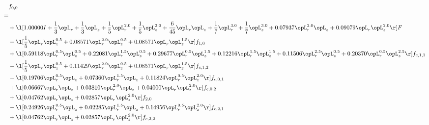 \begin{alignat}{2} 
\label{eq:f_00_2} 
& f_{0,0} \nonumber \\ 
 = \\ 
& + \l[  1.00000 I + \frac{1}{3} \opL_r + \frac{1}{3} \opL_z + \frac{1}{5} \opL_r^{2.0} + \frac{1}{5} \opL_z^{2.0} + \frac{6}{45} \opL_r \opL_z + \frac{1}{7} \opL_r^{3.0} + \frac{1}{7} \opL_z^{3.0} +  0.07937 \opL_r^{2.0} \opL_z +  0.09079 \opL_r \opL_z^{2.0}  \r] F \nonumber \\ 
& - \l[ \frac{1}{5} \opL_r \opL_z^{0.5} +  0.08571 \opL_r^{2.0} \opL_z^{0.5} +  0.08571 \opL_r \opL_z^{1.5}  \r] f_{1,0} \nonumber \\ 
& + \l[  0.59118 \opL_r^{0.5} \opL_z^{0.5} +  0.22081 \opL_r^{1.5} \opL_z^{0.5} +  0.29677 \opL_r^{0.5} \opL_z^{1.5} +  0.12216 \opL_r^{1.5} \opL_z^{1.5} +  0.11506 \opL_r^{2.5} \opL_z^{0.5} +  0.20370 \opL_r^{0.5} \opL_z^{2.5}  \r] f_{c,1,1} \nonumber \\ 
& - \l[ \frac{1}{5} \opL_r \opL_z^{0.5} +  0.11429 \opL_r^{2.0} \opL_z^{0.5} +  0.08571 \opL_r \opL_z^{1.5}  \r] f_{c,1,2} \nonumber \\ 
& - \l[  0.19706 \opL_r^{0.5} \opL_z +  0.07360 \opL_r^{1.5} \opL_z +  0.11824 \opL_r^{0.5} \opL_z^{2.0}  \r] f_{c,0,1} \nonumber \\ 
& + \l[  0.06667 \opL_r \opL_z +  0.03810 \opL_r^{2.0} \opL_z +  0.04000 \opL_r \opL_z^{2.0}  \r] f_{c,0,2} \nonumber \\ 
& + \l[  0.04762 \opL_r \opL_z +  0.02857 \opL_r \opL_z^{2.0}  \r] f_{2,0} \nonumber \\ 
& - \l[  0.24926 \opL_r^{0.5} \opL_z +  0.02285 \opL_r^{1.5} \opL_z +  0.14956 \opL_r^{0.5} \opL_z^{2.0}  \r] f_{c,2,1} \nonumber \\ 
& + \l[  0.04762 \opL_r \opL_z +  0.02857 \opL_r \opL_z^{2.0}  \r] f_{c,2,2} \nonumber \\ 
\end{alignat} 



